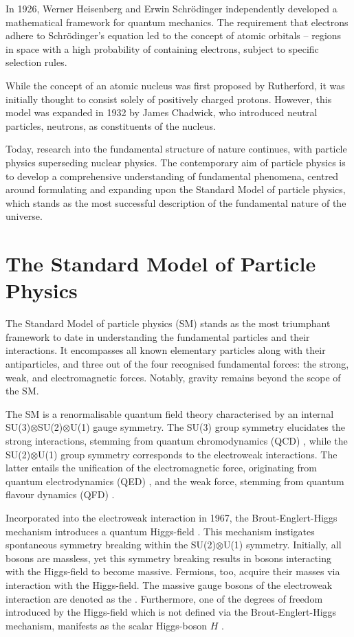 In 1926, Werner Heisenberg and Erwin Schrödinger independently developed a mathematical framework for quantum mechanics. The requirement that electrons adhere to Schrödinger's equation led to the concept of atomic orbitals – regions in space with a high probability of containing electrons, subject to specific selection rules.

While the concept of an atomic nucleus was first proposed by Rutherford, it was initially thought to consist solely of positively charged protons. However, this model was expanded in 1932 by James Chadwick, who introduced neutral particles, neutrons, as constituents of the nucleus.

Today, research into the fundamental structure of nature continues, with particle physics superseding nuclear physics. The contemporary aim of particle physics is to develop a comprehensive understanding of fundamental phenomena, centred around formulating and expanding upon the Standard Model of particle physics, which stands as the most successful description of the fundamental nature of the universe.


\chapter{The Standard Model of Particle Physics}
\label{ch:standard_model}

The Standard Model of particle physics (SM) stands as the most triumphant framework to date in understanding the fundamental particles and their interactions. It encompasses all known elementary particles along with their antiparticles, and three out of the four recognised fundamental forces: the strong, weak, and electromagnetic forces. Notably, gravity remains beyond the scope of the SM.

The SM is a renormalisable quantum field theory characterised by an internal SU(3)$\otimes$SU(2)$\otimes$U(1) gauge symmetry. The SU(3) group symmetry elucidates the strong interactions, stemming from quantum chromodynamics (QCD) \cite{qcd}, while the SU(2)$\otimes$U(1) group symmetry corresponds to the electroweak interactions. The latter entails the unification of the electromagnetic force, originating from quantum electrodynamics (QED) \cite{qed01, qed02, qed03}, and the weak force, stemming from quantum flavour dynamics (QFD) \cite{qft}.

Incorporated into the electroweak interaction in 1967, the Brout-Englert-Higgs mechanism introduces a quantum Higgs-field \cite{higgs_mechanism_1, higgs_mechanism_2, higgs_mechanism_3}. This mechanism instigates spontaneous symmetry breaking within the SU(2)$\otimes$U(1) symmetry. Initially, all bosons are massless, yet this symmetry breaking results in bosons interacting with the Higgs-field to become massive. Fermions, too, acquire their masses via interaction with the Higgs-field. The massive gauge bosons of the electroweak interaction are denoted as the \zwboson. Furthermore, one of the degrees of freedom introduced by the Higgs-field which is not defined via the Brout-Englert-Higgs mechanism, manifests as the scalar Higgs-boson $H$ \cite{higgs_mechanism_1}.

